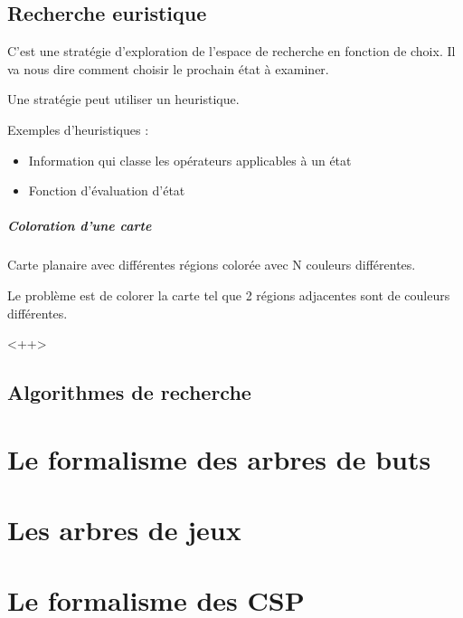\documentclass[12pt,a4paper,openany]{book}
\begin{document}
		\section{Recherche euristique}
		C'est une stratégie d'exploration de l'espace de recherche en fonction de choix. Il va nous dire comment choisir le prochain état à examiner.

		Une stratégie peut utiliser un heuristique.

			\begin{exemple}
				Exemples d'heuristiques : 
				\begin{itemize}
					\item Information qui classe les opérateurs applicables à un état
					\item Fonction d'évaluation d'état
			\end{itemize}
		\end{exemple}

		\begin{exemple}
			\paragraph{Coloration d'une carte}
			Carte planaire avec différentes régions colorée avec N couleurs différentes.

			Le problème est de colorer la carte tel que 2 régions adjacentes sont de couleurs différentes.
		\end{exemple}<++>
		\section{Algorithmes de recherche}

	\chapter{Le formalisme des arbres de buts}
	\chapter{Les arbres de jeux}
	\chapter{Le formalisme des CSP}
\end{document}

